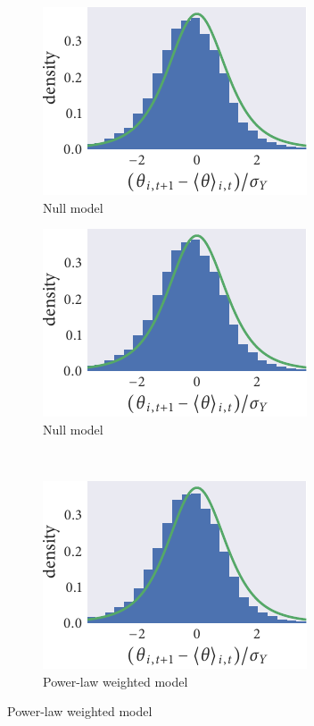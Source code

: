 \begin{figure}
  \begin{subfigure}[b]{0.33333\textwidth}
    \caption{Null model}
    \includegraphics{seq2/null_residuals.pdf}
  \end{subfigure}\hspace{2pt}
  \begin{subfigure}[b]{0.33333\textwidth}
    \caption{Null model}
    \includegraphics{seq2/null_residuals.pdf}
  \end{subfigure}\vspace{1em}\\
  \begin{subfigure}[b]{0.33333\textwidth}
    \includegraphics{seq2/power_residuals.pdf}
    \caption{Power-law weighted model}

\end{subfigure}
\end{figure}
